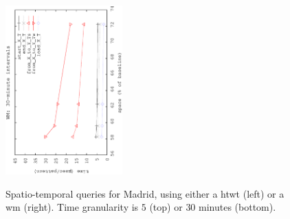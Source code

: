 \begin{figure}[ht]
\begin{center}
			{\includegraphics[angle=-90,width=0.4\textwidth]{figures_synt/madrid_wm30.eps}}
		\end{center}
		\caption{Spatio-temporal queries for Madrid, using either a \acrshort{htwt} (left) or a \acrshort{wm} (right). 
			Time granularity is $5$ (top) or $30$ minutes (bottom). 
		}
		\label{fig:ctr:exp:queries:st:madrid}
	\end{figure}




